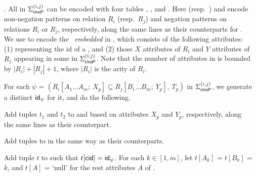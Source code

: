 . All \pCINDs in $\Sigma_{{\mathsf{cind^p}}}^{(i,j)}$
can be encoded with four tables
\Enc{}, ,  and \Enc{\ne}.
Here  (resp.~) and \Enc{\ne} encode non-negation
patterns on relation $R_i$ (resp.~$R_j$)
and negation patterns on relations $R_i$ or $R_j$,
respectively, along the same lines as their counterparts for
\pCFDs. We use
\Enc{} to encode the \INDs\ {\em embedded} in
\pCINDs, which consists of the following attributes: (1) 
representing the id of a \pCIND,  and (2) those $X$ attributes of $R_i$
and $Y$ attributes of $R_j$ appearing in some \pCINDs in $\Sigma_{{\mathsf{cind^p}}}^{(i,j)}$.
Note that the number of attributes in \Enc{} is bounded by $|R_i| + |R_j|
+ 1$, where $|R_i|$ is the arity of $R_i$.


For each \pCIND $\psi$ = $(R_i[A_1\ldots A_m;\ X_p] \subseteq
R_j[B_1\ldots B_m;\ Y_p],\ T_p)$ in $\Sigma_{{\mathsf{cind^p}}}^{(i,j)}$, we generate a
distinct  ${\mathsf{id}}_\psi$ for it, and do the following.

\vspace{-0.5ex}\bi
\item Add tuples $t_1$ and $t_2$ to  and 
based on attributes $X_p$ and $Y_p$, respectively, along the
same lines as their \pCFD counterpart.
\item Add tuples to \Enc{\ne} in the same way as their
\pCFD counterparts.
\item Add tuple $t$ to \Enc{} such that $t[\protect\mathsf{cid}] = {\mathsf{id}}_\psi$.
For each $k\in[1, m]$,  let $t[A_k]$ = $t[B_k]$ = $k$, and $t[A]$ =
`null' for the rest attributes $A$ of \Enc{}. \ei \vspace{-1ex}


